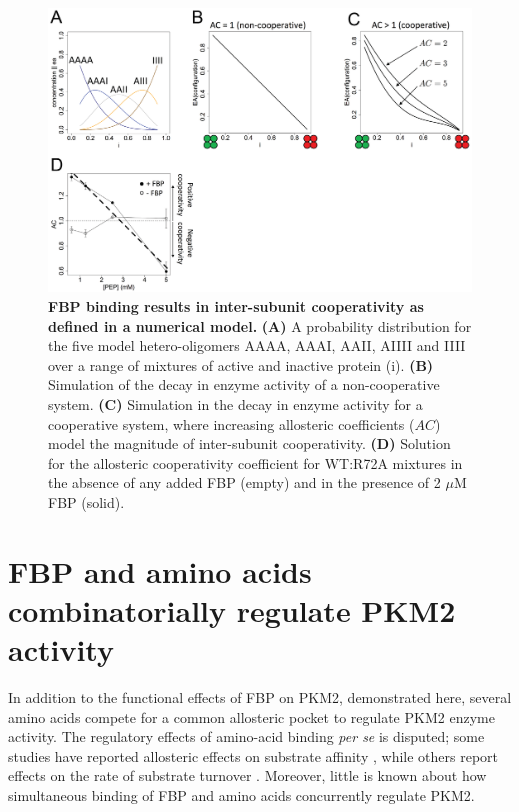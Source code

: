\begin{figure}[!ht]
\includegraphics[scale=0.7]{ch4_fig9_mutant_doping_theory.png}
\caption[FBP binding results in inter-subunit cooperativity as defined in a numerical model.] {\textbf{FBP binding results in inter-subunit cooperativity as defined in a numerical model.} \textbf{(A)} A probability distribution for the five model hetero-oligomers AAAA, AAAI, AAII, AIIII and IIII over a range of mixtures of active and inactive protein (i). \textbf{(B)} Simulation of the decay in enzyme activity of a non-cooperative system. \textbf{(C)} Simulation in the decay in enzyme activity for a cooperative system, where increasing allosteric coefficients ($AC$) model the magnitude of inter-subunit cooperativity. \textbf{(D)} Solution for the allosteric cooperativity coefficient for WT:R72A mixtures in the absence of any added FBP (empty) and in the presence of 2 $\mu$M FBP (solid).}
\label{fig:mut_doping_theory}
\end{figure}
%
%
\clearpage

\section{FBP and amino acids combinatorially regulate PKM2 activity}
In addition to the functional effects of FBP on PKM2, demonstrated here, several amino acids compete for a common allosteric pocket \cite{Yuan:2018aa,Morgan:2013aa,Chaneton:2012aa} to regulate PKM2 enzyme activity. The regulatory effects of amino-acid binding \textit{per se} is disputed; some studies have reported allosteric effects on substrate affinity \cite{Ashizawa:1990aa,Ikeda:1998aa,Sparmann:1973aa,Chaneton:2012aa}, while others report effects on the rate of substrate turnover \cite{Morgan:2013aa,Yuan:2018aa}. Moreover, little is known about how simultaneous binding of FBP and amino acids concurrently regulate PKM2.

